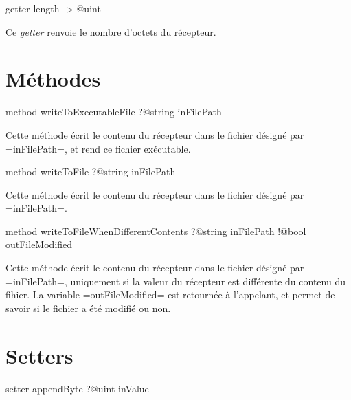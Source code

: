 \begin{galgas}
getter length -> @uint
\end{galgas}

Ce \emph{getter} renvoie le nombre d'octets du récepteur.





\section{Méthodes}



\begin{galgas}
method writeToExecutableFile ?@string inFilePath
\end{galgas}

Cette méthode écrit le contenu du récepteur dans le fichier désigné par \ggs=inFilePath=, et rend ce fichier exécutable.





\begin{galgas}
method writeToFile ?@string inFilePath
\end{galgas}

Cette méthode écrit le contenu du récepteur dans le fichier désigné par \ggs=inFilePath=.





\begin{galgas}
method writeToFileWhenDifferentContents
  ?@string inFilePath
  !@bool outFileModified
\end{galgas}

Cette méthode écrit le contenu du récepteur dans le fichier désigné par \ggs=inFilePath=, uniquement si la valeur du récepteur est différente du contenu du fihier. La variable \ggs=outFileModified= est retournée à l'appelant, et permet de savoir si le fichier a été modifié ou non.







\section{Setters}



\begin{galgas}
setter appendByte ?@uint inValue
\end{galgas}

